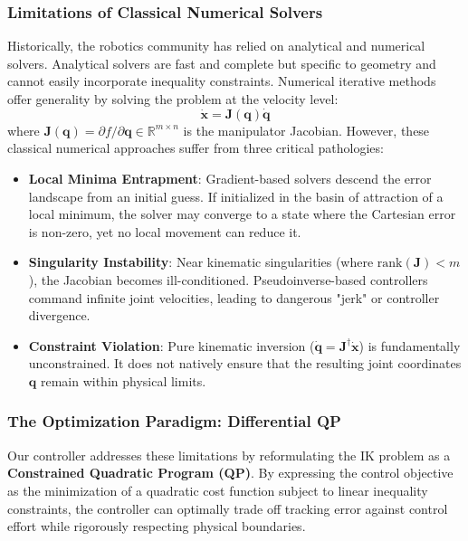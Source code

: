 \documentclass[12pt,a4paper]{report}
\begin{document}
\subsubsection{Limitations of Classical Numerical Solvers}
Historically, the robotics community has relied on analytical and numerical solvers. Analytical solvers are fast and complete but specific to geometry and cannot easily incorporate inequality constraints. Numerical iterative methods offer generality by solving the problem at the velocity level:
\begin{equation}
    \dot{\mathbf{x}} = \mathbf{J}(\mathbf{q})\dot{\mathbf{q}}
\end{equation}
where $\mathbf{J}(\mathbf{q}) = \partial f / \partial \mathbf{q} \in \mathbb{R}^{m \times n}$ is the manipulator Jacobian. However, these classical numerical approaches suffer from three critical pathologies:
\begin{itemize}
    \item \textbf{Local Minima Entrapment}: Gradient-based solvers descend the error landscape from an initial guess. If initialized in the basin of attraction of a local minimum, the solver may converge to a state where the Cartesian error is non-zero, yet no local movement can reduce it.
    \item \textbf{Singularity Instability}: Near kinematic singularities (where $\text{rank}(\mathbf{J}) < m$), the Jacobian becomes ill-conditioned. Pseudoinverse-based controllers command infinite joint velocities, leading to dangerous "jerk" or controller divergence.
    \item \textbf{Constraint Violation}: Pure kinematic inversion ($\dot{\mathbf{q}} = \mathbf{J}^\dagger \dot{\mathbf{x}}$) is fundamentally unconstrained. It does not natively ensure that the resulting joint coordinates $\mathbf{q}$ remain within physical limits.
\end{itemize}

\subsubsection{The Optimization Paradigm: Differential QP}
Our controller addresses these limitations by reformulating the IK problem as a \textbf{Constrained Quadratic Program (QP)}. By expressing the control objective as the minimization of a quadratic cost function subject to linear inequality constraints, the controller can optimally trade off tracking error against control effort while rigorously respecting physical boundaries. 
\end{document}
